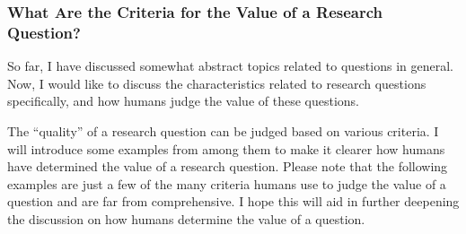 


\subsubsection{What Are the Criteria for the Value of a Research Question?}

So far, I have discussed somewhat abstract topics related to questions in general. Now, I would like to discuss the characteristics related to research questions specifically, and how humans judge the value of these questions. 

The ``quality'' of a research question can be judged based on various criteria. I will introduce some examples from among them to make it clearer how humans have determined the value of a research question. Please note that the following examples are just a few of the many criteria humans use to judge the value of a question and are far from comprehensive. I hope this will aid in further deepening the discussion on how humans determine the value of a question.

